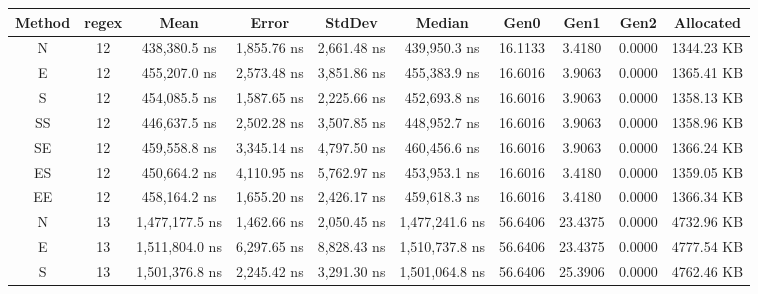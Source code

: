 \begin{sidewaystable}
    \begin{tabular}{|c|c|c|c|c|c|c|c|c|c|}
        \hline
        Method  &   regex   &   Mean                  &   Error             &   StdDev                &   Median                &   Gen0        &   Gen1        &   Gen2        &   Allocated        \\
        \hline
        N       &   12      &   438,380.5 ns          &   1,855.76 ns       &   2,661.48 ns           &   439,950.3 ns          &   16.1133     &   3.4180      &   0.0000      &   1344.23 KB       \\
        E       &   12      &   455,207.0 ns          &   2,573.48 ns       &   3,851.86 ns           &   455,383.9 ns          &   16.6016     &   3.9063      &   0.0000      &   1365.41 KB       \\
        S       &   12      &   454,085.5 ns          &   1,587.65 ns       &   2,225.66 ns           &   452,693.8 ns          &   16.6016     &   3.9063      &   0.0000      &   1358.13 KB       \\
        SS      &   12      &   446,637.5 ns          &   2,502.28 ns       &   3,507.85 ns           &   448,952.7 ns          &   16.6016     &   3.9063      &   0.0000      &   1358.96 KB       \\
        SE      &   12      &   459,558.8 ns          &   3,345.14 ns       &   4,797.50 ns           &   460,456.6 ns          &   16.6016     &   3.9063      &   0.0000      &   1366.24 KB       \\
        ES      &   12      &   450,664.2 ns          &   4,110.95 ns       &   5,762.97 ns           &   453,953.1 ns          &   16.6016     &   3.4180      &   0.0000      &   1359.05 KB       \\
        EE      &   12      &   458,164.2 ns          &   1,655.20 ns       &   2,426.17 ns           &   459,618.3 ns          &   16.6016     &   3.4180      &   0.0000      &   1366.34 KB       \\
        N       &   13      &   1,477,177.5 ns        &   1,462.66 ns       &   2,050.45 ns           &   1,477,241.6 ns        &   56.6406     &   23.4375     &   0.0000      &   4732.96 KB       \\
        E       &   13      &   1,511,804.0 ns        &   6,297.65 ns       &   8,828.43 ns           &   1,510,737.8 ns        &   56.6406     &   23.4375     &   0.0000      &   4777.54 KB       \\
        S       &   13      &   1,501,376.8 ns        &   2,245.42 ns       &   3,291.30 ns           &   1,501,064.8 ns        &   56.6406     &   25.3906     &   0.0000      &   4762.46 KB       \\

\end{tabular}
\end{sidewaystable}
